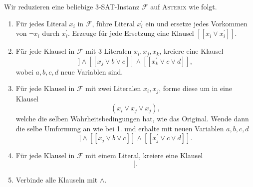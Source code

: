 \documentclass{article}
\begin{document}
Wir reduzieren eine beliebige \textsc{3-SAT}-Instanz $\mathcal{F}$ auf \textsc{Asterix} wie
folgt. 

\begin{enumerate}
   \item Für jedes Literal $x_i$ in $\mathcal{F}$, führe Literal $x_i^\prime$
      ein und ersetze jedes Vorkommen von $\neg x_i$ durch $x_i^\prime$. Erzeuge
      für jede Ersetzung eine Klausel $[[x_i \vee x_i^\prime]]$.
   \item Für jede Klausel in $\mathcal{F}$ mit 3 Literalen $x_i, x_j, x_k$, kreiere eine Klausel 
      \begin{equation*}
         [[x_i^\prime \vee a \vee b]] \wedge [[x_j \vee b \vee c]] \wedge [[x_k^\prime \vee c
         \vee d]],
      \end{equation*} wobei $a, b, c, d$ neue Variablen sind.
   \item Für jede Klausel in $\mathcal{F}$ mit zwei Literalen $x_i, x_j$, forme
      diese um in eine Klausel
      \begin{equation*}
         (x_i \vee x_j \vee x_j),
      \end{equation*} welche die selben Wahrheitsbedingungen hat, wie das
      Original. Wende dann die selbe Umformung an wie bei 1. und erhalte mit
      neuen Variablen $a,b,c,d$
      \begin{equation*}
         [[x_i^\prime \vee a \vee b]] \wedge [[x_j \vee b \vee c]] \wedge [[x_j^\prime \vee c
         \vee d]].
      \end{equation*}
   \item Für jede Klausel in $\mathcal{F}$ mit einem Literal, kreiere eine
      Klausel
      \begin{equation*}
         [[x_i]].
      \end{equation*}
   \item Verbinde alle Klauseln mit $\wedge$.
\end{enumerate}
\end{document}
